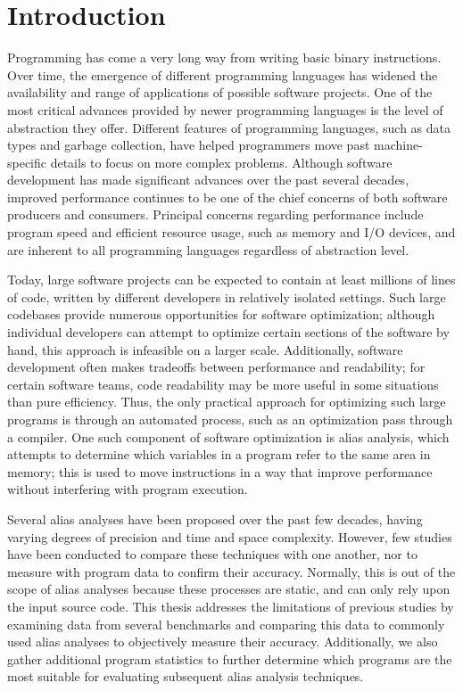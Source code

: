 \chapter{Introduction}

Programming has come a very long way from writing basic binary instructions. Over time, the emergence of different programming languages has widened the availability and range of applications of possible software projects. One of the most critical advances provided by newer programming languages is the level of abstraction they offer. Different features of programming languages, such as data types and garbage collection, have helped programmers move past machine-specific details to focus on more complex problems. Although software development has made significant advances over the past several decades, improved performance continues to be one of the chief concerns of both software producers and consumers. Principal concerns regarding performance include program speed and efficient resource usage, such as memory and I/O devices, and are inherent to all programming languages regardless of abstraction level.

Today, large software projects can be expected to contain at least millions of lines of code\cite{google}, written by different developers in relatively isolated settings. Such large codebases provide numerous opportunities for software optimization; although individual developers can attempt to optimize certain sections of the software by hand, this approach is infeasible on a larger scale. Additionally, software development often makes tradeoffs between performance and readability; for certain software teams, code readability may be more useful in some situations than pure efficiency. Thus, the only practical approach for optimizing such large programs is through an automated process, such as an optimization pass through a compiler. One such component of software optimization is alias analysis, which attempts to determine which variables in a program refer to the same area in memory; this is used to move instructions in a way that improve performance without interfering with program execution.

Several alias analyses have been proposed over the past few decades, having varying degrees of precision and time and space complexity. However, few studies have been conducted to compare these techniques with one another, nor to measure with program data to confirm their accuracy. Normally, this is out of the scope of alias analyses because these processes are static, and can only rely upon the input source code. This thesis addresses the limitations of previous studies by examining data from several benchmarks and comparing this data to commonly used alias analyses to objectively measure their accuracy. Additionally, we also gather additional program statistics to further determine which programs are the most suitable for evaluating subsequent alias analysis techniques.

